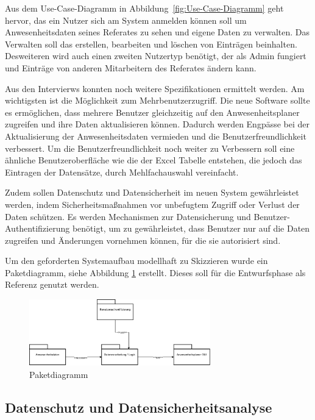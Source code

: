 Aus dem Use-Case-Diagramm in Abbildung~\ref{fig:Use-Case-Diagramm} geht hervor, das ein Nutzer sich am System anmelden können soll um Anwesenheitsdaten seines Referates zu sehen und eigene Daten zu verwalten. Das Verwalten soll das erstellen, bearbeiten und löschen von Einträgen beinhalten. Desweiteren wird auch einen zweiten Nutzertyp benötigt, der als Admin fungiert und Einträge von anderen Mitarbeitern des Referates ändern kann.

Aus den Intervierws konnten noch weitere Spezifikationen ermittelt werden. Am wichtigsten ist die Möglichkeit zum Mehrbenutzerzugriff. Die neue Software sollte es ermöglichen, dass mehrere Benutzer gleichzeitig auf den Anwesenheitsplaner zugreifen und ihre Daten aktualisieren können. Dadurch werden Engpässe bei der Aktualisierung der Anwesenheitsdaten vermieden und die Benutzerfreundlichkeit verbessert. Um die Benutzerfreundlichkeit noch weiter zu Verbessern soll eine ähnliche Benutzeroberfläche wie die der Excel Tabelle entstehen, die jedoch das Eintragen der Datensätze, durch \zB Mehlfachauswahl vereinfacht.

Zudem sollen Datenschutz und Datensicherheit im neuen System gewährleistet werden, indem Sicherheitsmaßnahmen vor unbefugtem Zugriff oder Verlust der Daten schützen. Es werden Mechanismen zur Datensicherung und Benutzer-Authentifizierung benötigt, um zu gewährleistet, dass Benutzer nur auf die Daten zugreifen und Änderungen vornehmen können, für die sie autorisiert sind.

Um den geforderten Systemaufbau modellhaft zu Skizzieren wurde ein Paketdiagramm, siehe Abbildung \ref{abb:Paketdiagramm} erstellt. Dieses soll für die Entwurfsphase als Referenz genutzt werden.

\begin{figure}[htb]
    \centering
    \includegraphics[width=0.7\textwidth,angle=0]{abb/Paketdiagramm.pdf}
    \caption[Beschreibung]{Paketdiagramm}
    \label{abb:Paketdiagramm}
\end{figure}

\subsection{Datenschutz und Datensicherheitsanalyse}
\label{sec:Datenschutz}
